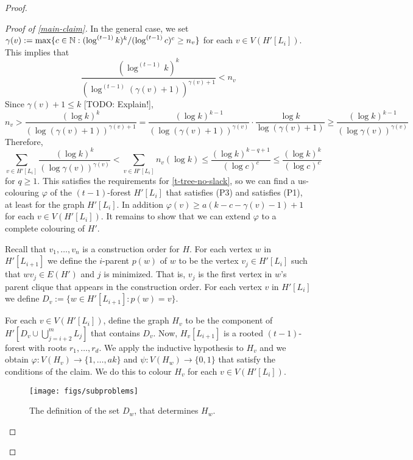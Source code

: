 \documentclass[kpfonts]{patmorin}
\theoremstyle{named}
\begin{document}
\begin{proof}
\begin{proof}[Proof of \cref{main-claim}]
        In the general case, we set $\gamma(v):=\max\{c\in\mathbb{N}:(\log^{(t-1)} k)^k/(\log^{(t-1)} c)^c \ge n_v\}$ for each $v\in V(H'[L_i])$.  This implies that
        \[
            \frac{(\log^{(t-1)} k)^k}{(\log^{(t-1)}(\gamma(v)+1))^{\gamma(v)+1}} < n_v
        \]
        Since $\gamma(v)+1\le k$ [TODO: Explain!],
        \[
           n_v > \frac{(\log k)^k}{(\log(\gamma(v)+1))^{\gamma(v)+1}}
           = \frac{(\log k)^{k-1}}{(\log(\gamma(v)+1))^{\gamma(v)}}
            \cdot
            \frac{\log k}{\log(\gamma(v)+1)}
           \ge
           \frac{(\log k)^{k-1}}{(\log\gamma(v))^{\gamma(v)}}
       \]
       Therefore,
       \[
           \sum_{v\in H'[L_i]} \frac{(\log k)^k}{(\log \gamma(v))^{\gamma(v)}} < \sum_{v\in H'[L_i]} n_v(\log k)
           \le \frac{(\log k)^{k-q+1}}{(\log c)^c}
           \le \frac{(\log k)^k}{(\log c)^c}
       \]
       for $q\ge 1$.  This satisfies the requirements for \cref{t-tree-no-slack}, so we can find a us-colouring $\varphi$ of the $(t-1)$-forest $H'[L_i]$ that satisfies (P3) and satisfies (P1), at least for the graph $H'[L_i]$. In addition $\varphi(v)\ge a(k-c-\gamma(v)-1)+1$ for each $v\in V(H'[L_i])$.  It remains to show that we can extend $\varphi$ to a complete colouring of $H'$.

       Recall that $v_1,\ldots,v_n$ is a construction order for $H$. For each vertex $w$ in $H'[L_{i+1}]$ we define the $i$-parent $p(w)$ of $w$ to be the vertex $v_j\in H'[L_i]$ such that $wv_j\in E(H')$ and $j$ is minimized.  That is, $v_j$ is the first vertex in $w$'s parent clique that appears in the construction order.  For each vertex $v$ in $H'[L_i]$ we define $D_v:=\{w\in H'[L_{i+1}]: p(w)=v\}$.

       For each $v\in V(H'[L_i])$, define the graph $H_v$ to be the component of $H'[D_v\cup \bigcup_{j=i+2}^m L_j]$ that contains $D_v$.
       Now, $H_v[L_{i+1}]$ is a rooted $(t-1)$-forest with roots $r_1,\ldots,r_d$.  We apply the inductive hypothesis to $H_v$ and we obtain $\varphi:V(H_v)\to\{1,\ldots,ak\}$ and $\psi:V(H_w)\to\{0,1\}$ that satisfy the conditions of the claim.  We do this to colour $H_v$ for each $v\in V(H'[L_i])$.

       \begin{figure}
           \begin{center}
                \texttt{[image: figs/subproblems]}
           \end{center}
           \caption{The definition of the set $D_w$, that determines $H_w$.}
           \label{subproblems}
       \end{figure}


\end{proof}
\end{proof}
\end{document}
